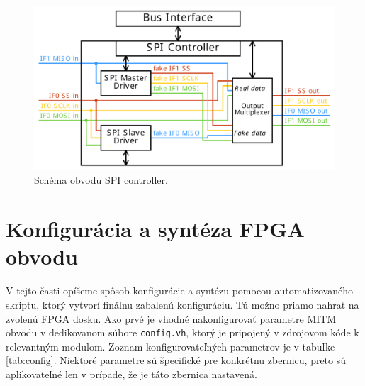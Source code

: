 \begin{figure}
    \centerline{\includegraphics[width=1\textwidth]{images/designs/spiController.pdf}}
    \caption[Schéma obvodu SPI controller]{Schéma obvodu SPI controller.}
    \label{obr:spiController}
\end{figure}

\section{Konfigurácia a syntéza FPGA obvodu}
V tejto časti opíšeme spôsob konfigurácie a syntézu pomocou automatizovaného skriptu, ktorý vytvorí finálnu zabalenú konfiguráciu. Tú možno priamo nahrať na zvolenú FPGA dosku. Ako prvé je vhodné nakonfigurovať parametre MITM obvodu v dedikovanom súbore \texttt{config.vh}, ktorý je pripojený v zdrojovom kóde k relevantným modulom. Zoznam konfigurovateľných parametrov je v tabuľke \ref{tab:config}. Niektoré parametre sú špecifické pre konkrétnu zbernicu, preto sú aplikovateľné len v prípade, že je táto zbernica nastavená.

